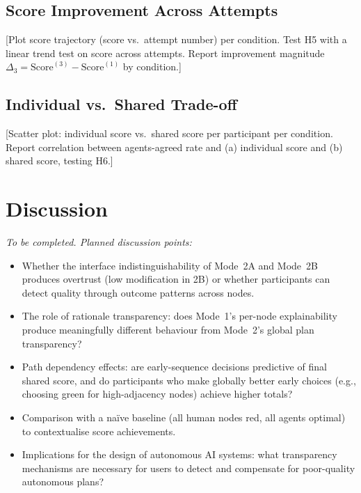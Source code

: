 \documentclass[11pt]{article}
\theoremstyle{definition}
\begin{document}
\subsection{Score Improvement Across Attempts}

[Plot score trajectory (score vs.\ attempt number) per condition.  Test H5 with a
linear trend test on score across attempts.  Report improvement magnitude $\Delta_3
= \text{Score}^{(3)} - \text{Score}^{(1)}$ by condition.]

\subsection{Individual vs.\ Shared Trade-off}

[Scatter plot: individual score vs.\ shared score per participant per condition.  Report
correlation between agents-agreed rate and (a) individual score and (b) shared score,
testing H6.]

\section{Discussion}
\label{sec:discussion}

\textit{To be completed.  Planned discussion points:}

\begin{itemize}[nosep]
  \item Whether the interface indistinguishability of Mode~2A and Mode~2B produces
    overtrust (low modification in 2B) or whether participants can detect quality
    through outcome patterns across nodes.
  \item The role of rationale transparency: does Mode~1's per-node explainability
    produce meaningfully different behaviour from Mode~2's global plan transparency?
  \item Path dependency effects: are early-sequence decisions predictive of final
    shared score, and do participants who make globally better early choices (e.g.,
    choosing green for high-adjacency nodes) achieve higher totals?
  \item Comparison with a na\"{i}ve baseline (all human nodes red, all agents optimal)
    to contextualise score achievements.
  \item Implications for the design of autonomous AI systems: what transparency
    mechanisms are necessary for users to detect and compensate for poor-quality
    autonomous plans?
\end{itemize}
\end{document}
